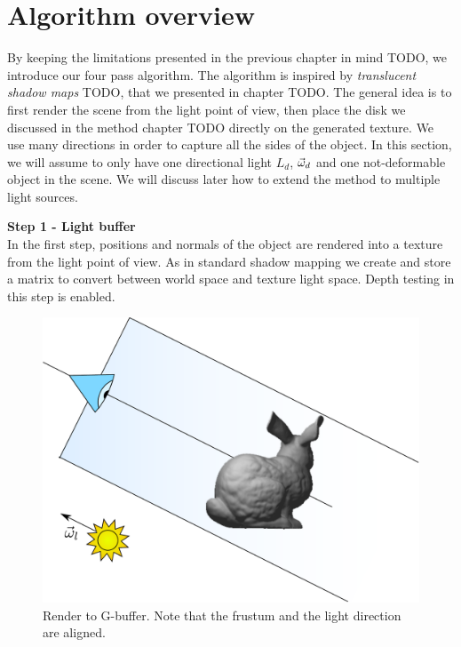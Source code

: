 \section{Algorithm overview}

By keeping the limitations presented in the previous chapter in mind TODO, we introduce our four pass algorithm. The algorithm is inspired by \emph{translucent shadow maps} TODO, that we presented in chapter TODO. The general idea is to first render the scene from the light point of view, then place the disk we discussed in the method chapter TODO directly on the generated texture. We use many directions in order to capture all the sides of the object. In this section, we will assume to only have one directional light $L_d$, $\vec{\omega}_d$ and one not-deformable object in the scene. We will discuss later how to extend the method to multiple light sources.

\textbf{Step 1 - Light buffer} \\

In the first step, positions and normals of the object are rendered into a texture from the light point of view. As in standard shadow mapping we create and store a matrix to convert between world space and texture light space. Depth testing in this step is enabled.

\begin{figure}[!ht]
\centering
\includegraphics[width=0.8 \linewidth]{images/method/step1.pdf}
\caption{Render to G-buffer. Note that the frustum and the light direction are aligned.}
\label{fig:step1}
\end{figure} 


